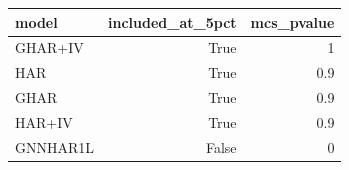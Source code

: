 \begin{tabular}{lrr}
\toprule
model & included_at_5pct & mcs_pvalue \\
\midrule
GHAR+IV & True & 1 \\
HAR & True & 0.9 \\
GHAR & True & 0.9 \\
HAR+IV & True & 0.9 \\
GNNHAR1L & False & 0 \\
\bottomrule
\end{tabular}
